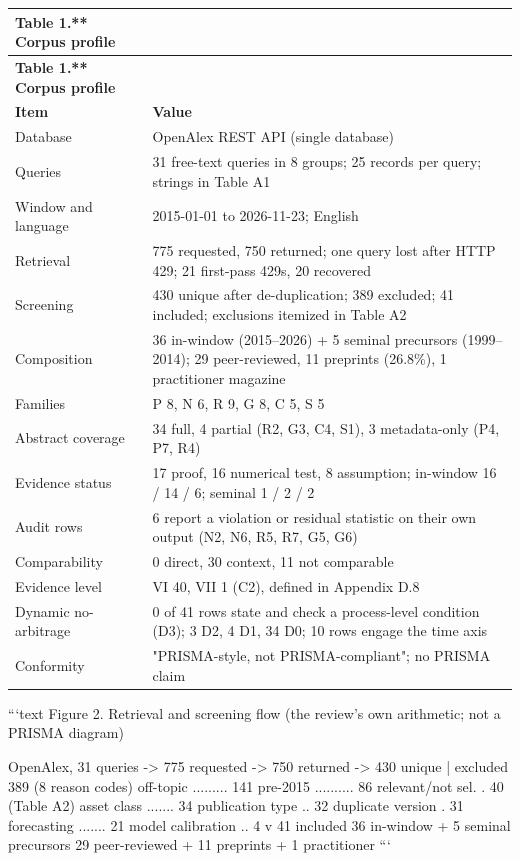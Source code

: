 \documentclass[11pt]{article}
\begin{document}
\begingroup
\begin{longtable}{@{}p{}p{}@{}}
\toprule
\textbf{Table 1.** Corpus profile} & \textbf{} \\
\midrule
\endfirsthead
\toprule
\textbf{Table 1.** Corpus profile} & \textbf{} \\
\midrule
\endhead
\textbf{Item} & \textbf{Value} \\
Database & OpenAlex REST API (single database) \\
Queries & 31 free-text queries in 8 groups; 25 records per query; strings in Table A1 \\
Window and language & 2015-01-01 to 2026-11-23; English \\
Retrieval & 775 requested, 750 returned; one query lost after HTTP 429; 21 first-pass 429s, 20 recovered \\
Screening & 430 unique after de-duplication; 389 excluded; 41 included; exclusions itemized in Table A2 \\
Composition & 36 in-window (2015–2026) + 5 seminal precursors (1999–2014); 29 peer-reviewed, 11 preprints (26.8\%), 1 practitioner magazine \\
Families & P 8, N 6, R 9, G 8, C 5, S 5 \\
Abstract coverage & 34 full, 4 partial (R2, G3, C4, S1), 3 metadata-only (P4, P7, R4) \\
Evidence status & 17 proof, 16 numerical test, 8 assumption; in-window 16 / 14 / 6; seminal 1 / 2 / 2 \\
Audit rows & 6 report a violation or residual statistic on their own output (N2, N6, R5, R7, G5, G6) \\
Comparability & 0 direct, 30 context, 11 not comparable \\
Evidence level & VI 40, VII 1 (C2), defined in Appendix D.8 \\
Dynamic no-arbitrage & 0 of 41 rows state and check a process-level condition (D3); 3 D2, 4 D1, 34 D0; 10 rows engage the time axis \\
Conformity & "PRISMA-style, not PRISMA-compliant"; no PRISMA claim \\
\bottomrule
\end{longtable}
\endgroup

```text Figure 2. Retrieval and screening flow (the review's own arithmetic; not a PRISMA diagram)

OpenAlex, 31 queries -> 775 requested -> 750 returned -> 430 unique | excluded 389 (8 reason codes) off-topic ......... 141 pre-2015 .......... 86 relevant/not sel. . 40  (Table A2) asset class ....... 34 publication type .. 32 duplicate version . 31 forecasting ....... 21 model calibration .. 4 v 41 included 36 in-window + 5 seminal precursors 29 peer-reviewed + 11 preprints + 1 practitioner ```
\end{document}
